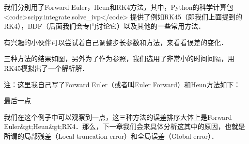 我们分别用了Forward Euler，Heun和RK4方法，其中，Python的科学计算包<code>scipy.integrate.solve_ivp</code>  提供了例如RK45（即我们上面提到的RK4），BDF（后面我们会专门讨论它）以及其他的一些常用方法．

有兴趣的小伙伴可以尝试着自己调整步长参数和方法，来看看误差的变化．


三种方法的结果如图，另外为了作为参照，我们选用了非常小的时间间隔，用RK45模拟出了一个解析解．

注：这里我自己写了Forward Euler（或者叫Euler Forward）和Heun方法如下：


    
最后一点

我们在这个例子中可以观察到一点，这三种方法的误差排序大体上是Forward Euler&gt;Heun&gt;RK4．那么，下一章我们会来具体分析这其中的原因，也就是所谓的局部残差（Local truncation error）和全局误差（Global error）．
